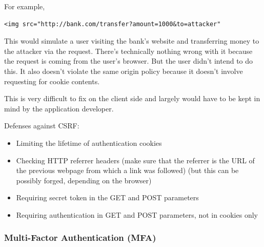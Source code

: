 \documentclass[../notes.tex]{subfiles}
\begin{document}
For example, 

\begin{listing}[H]
\begin{verbatim}
<img src="http://bank.com/transfer?amount=1000&to=attacker"
\end{verbatim}
\end{listing}

This would simulate a user visiting the bank's website and transferring money to the attacker via the request. There's technically nothing wrong with it because the request is coming from the user's browser. But the user didn't intend to do this.
It also doesn't violate the same origin policy because it doesn't involve requesting for cookie contents.

This is very difficult to fix on the client side and largely would have to be kept in mind by the application developer.


Defenses against CSRF:

\begin{itemize}
    \item Limiting the lifetime of authentication cookies
    \item Checking HTTP referrer headers (make sure that the referrer is the URL of the previous webpage from which a link was followed) (but this can be possibly forged, depending on the browser)
    \item Requiring secret token in the GET and POST parameters
    \item Requiring authentication in GET and POST parameters, not in cookies only
\end{itemize}



\subsubsection{Multi-Factor Authentication (MFA)}
\end{document}
